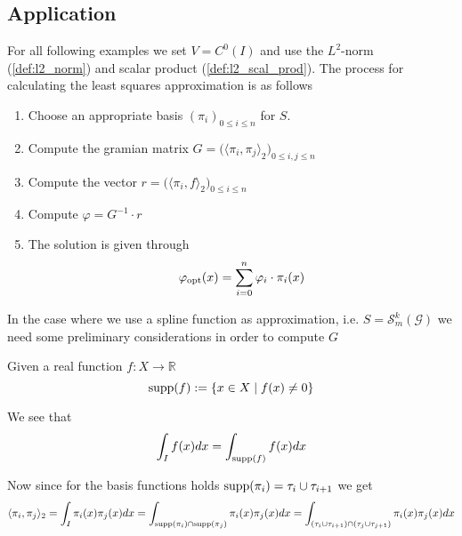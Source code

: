 \subsection{Application}
For all following examples we set \(V = C^0(I)\) and use the \(L^2\)-norm (\ref{def:l2_norm}) and scalar product (\ref{def:l2_scal_prod}).
The process for calculating the least squares approximation is as follows
\begin{enumerate}
   \item Choose an appropriate basis \((\pi_i)_{0 \leq i \leq n}\) for \(S\).
   \item Compute the gramian matrix \(G = \big(\langle \pi_i, \pi_j\rangle_2\big)_{0 \leq i,j \leq n}\)
   \item Compute the vector \(r = \big(\langle \pi_i, f\rangle_2\big)_{0 \leq i \leq n}\)
   \item Compute \(\varphi = G^{-1} \cdot r\)
   \item The solution is given through
      \[\varphi_{\operatorname{opt}}(x) = \sum_{i=0}^n \varphi_i \cdot \pi_i(x)\]
\end{enumerate}

In the case where we use a spline function as approximation, i.e. \(S = \mathcal{S}_m^k(\mathcal{G})\) we need some preliminary considerations in order to compute \(G\)
\begin{definition}
   Given a real function \(f: X \to \mathbb{R}\)
   \[\operatorname{supp}(f) := \{x \in X \mid f(x) \neq 0\}\]
\end{definition}
\begin{remark}
   We see that
   \[\int_I f(x) dx = \int_{\operatorname{supp}(f)} f(x) dx\]
\end{remark}
Now since for the basis functions holds \(\operatorname{supp}(\pi_i) = \tau_i \cup \tau_{i+1}\) we get
\[\langle \pi_i, \pi_j\rangle_2 = \int_I \pi_i(x)\pi_j(x) dx = \int_{\operatorname{supp}(\pi_i) \cap \operatorname{supp}(\pi_j)} \pi_i(x)\pi_j(x)dx = \int_{(\tau_i \cup \tau_{i+1})\cap(\tau_j \cup \tau_{j+1})} \pi_i(x)\pi_j(x)dx\]

